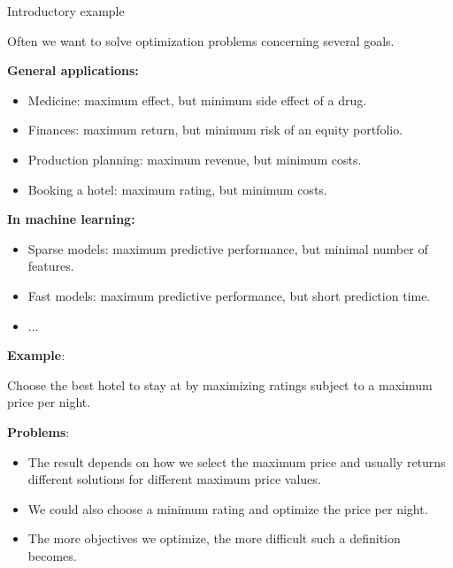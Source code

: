 \begin{frame}[allowframebreaks]{Introductory example}

Often we want to solve optimization problems concerning several goals.

    \vspace{0.5cm}
    \textbf{General applications:}
\begin{itemize}
\item Medicine: maximum effect, but minimum side effect of a drug.
\item Finances: maximum return, but minimum risk of an equity portfolio.
\item Production planning: maximum revenue, but minimum costs.
\item Booking a hotel: maximum rating, but minimum costs.
\end{itemize}

\vspace{0.5cm}
    \textbf{In machine learning:}
\begin{itemize}
\item Sparse models: maximum predictive performance, but minimal number of features.
\item Fast models: maximum predictive performance, but short prediction time.
\item ...
\end{itemize}


\vspace*{0.2cm}

\framebreak

\textbf{Example}:

Choose the best hotel to stay at by maximizing ratings subject to a maximum price per night.

\vspace*{0.5cm}

 \textbf{Problems}:

\begin{itemize}
 \item The result depends on how we select the maximum price and usually returns different solutions for different maximum price values.
 \item We could also choose a minimum rating and optimize the price per night.
 \item The more objectives we optimize, the more difficult such a definition becomes.
\end{itemize}


\end{frame}
